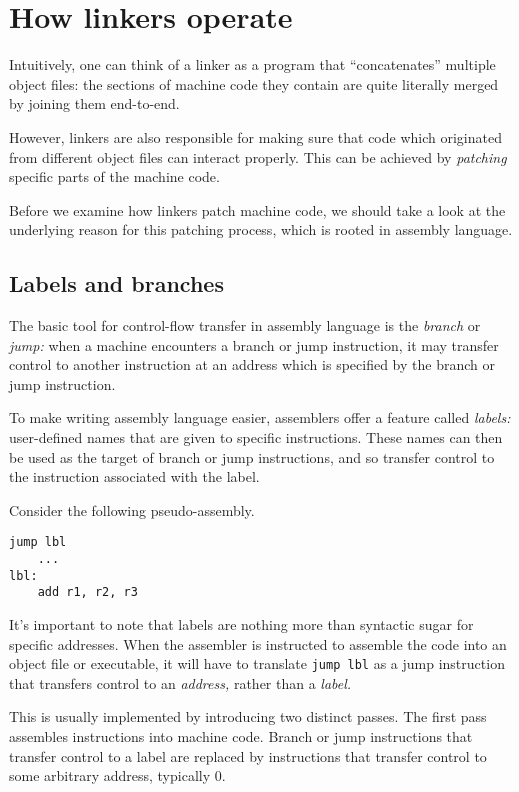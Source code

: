 \documentclass[12pt,a4paper]{article}
\begin{document}
\section{How linkers operate}

Intuitively, one can think of a linker as a program that ``concatenates'' multiple object files: the sections of machine code they contain are quite literally merged by joining them end-to-end.

However, linkers are also responsible for making sure that code which originated from different object files can interact properly. This can be achieved by \emph{patching} specific parts of the machine code.

Before we examine how linkers patch machine code, we should take a look at the underlying reason for this patching process, which is rooted in assembly language.

\subsection{Labels and branches}

The basic tool for control-flow transfer in assembly language is the \emph{branch} or \emph{jump:} when a machine encounters a branch or jump instruction, it may transfer control to another instruction at an address which is specified by the branch or jump instruction.

To make writing assembly language easier, assemblers offer a feature called \emph{labels:} user-defined names that are given to specific instructions. These names can then be used as the target of branch or jump instructions, and so transfer control to the instruction associated with the label.

Consider the following pseudo-assembly.\\

\begin{lstlisting}[caption=pseudo-assembly example: input,label=lst:asm-labels]
    jump lbl
    ...
lbl: 
    add r1, r2, r3
\end{lstlisting}

\noindent It's important to note that labels are nothing more than syntactic sugar for specific addresses. When the assembler is instructed to assemble the code into an object file or executable, it will have to translate \texttt{jump lbl} as a jump instruction that transfers control to an \emph{address,} rather than a \emph{label.} 

This is usually implemented by introducing two distinct passes. The first pass assembles instructions into machine code. Branch or jump instructions that transfer control to a label are replaced by instructions that transfer control to some arbitrary address, typically 0. 
\end{document}
